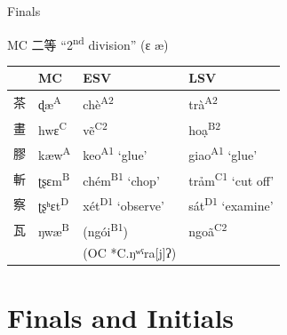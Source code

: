 \documentclass{beamer}
\begin{document}
\begin{frame}[fragile]{Finals}

MC 二等 \enquote{2\textsuperscript{nd} division} (ɛ æ)\\

\bigskip
\begin{tabular}{l|l|l l}
 & MC & ESV & LSV\\ \hline
茶 & ɖæ\textsuperscript{A} & chè\textsuperscript{A2} & trà\textsuperscript{A2}\\
畫 & hwɛ\textsuperscript{C} & vẽ\textsuperscript{C2} & hoạ\textsuperscript{B2}\\
膠 & kæw\textsuperscript{A} & keo\textsuperscript{A1} \enquote*{glue}& giao\textsuperscript{A1} \enquote*{glue}\\
斬 & ʈʂɛm\textsuperscript{B} & chém\textsuperscript{B1} \enquote*{chop} & trảm\textsuperscript{C1} \enquote*{cut off}\\
察 & ʈʂʰɛt\textsuperscript{D} & xét\textsuperscript{D1} \enquote*{observe} & sát\textsuperscript{D1} \enquote*{examine}\\
瓦 & ŋwæ\textsuperscript{B} & (ngói\textsuperscript{B1}) & ngoã\textsuperscript{C2}\\
 & & (OC *C.ŋʷˤra[j]ʔ) & \\
\end{tabular}
\end{frame}

\section{Finals and Initials}
\end{document}
